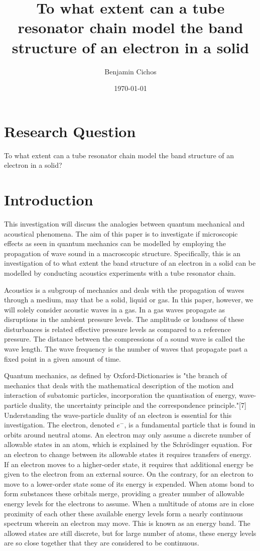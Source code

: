 \documentclass[12pt]{article}
\title{To what extent can a tube resonator chain model the band structure of an electron in a solid}
\author{Benjamin Cichos}
\date{\today}
\begin{document}
\section{Research Question}
To what extent can a tube resonator chain model the band structure of an electron in a solid?
\section{Introduction}  
	This investigation will discuss the analogies between quantum mechanical and acoustical phenomena. The aim of this paper is to investigate if microscopic effects as seen in quantum mechanics can be modelled by employing the propagation of wave sound in a macroscopic structure. Specifically, this is an investigation of to what extent the band structure of an electron in a solid can be modelled by conducting acoustics experiments with a tube resonator chain.	 
	
Acoustics is a subgroup of mechanics and deals with the propagation of waves through a medium, may that be a solid, liquid or gas. In this paper, however, we will solely consider acoustic waves in a gas. In a gas waves propagate as disruptions in the ambient pressure levels. The amplitude or loudness of these disturbances is related effective pressure levels as compared to a reference pressure. The distance between the compressions of a sound wave is called the wave length. The wave frequency is the number of waves that propagate past a fixed point in a given amount of time.
	
Quantum mechanics, as defined by Oxford-Dictionaries is "the branch of mechanics that deals with the mathematical description of the motion and interaction of subatomic particles, incorporation the quantisation of energy, wave-particle duality, the uncertainty principle and the correspondence principle."[7] Understanding the wave-particle duality of an electron is essential for this investigation. The electron, denoted $e^-$, is a fundamental particle that is found in orbits around neutral atoms. An electron may only assume a discrete number of allowable states in an atom, which is explained by the Schrödinger equation. For an electron to change between its allowable states it requires transfers of energy. If an electron moves to a higher-order state, it requires that additional energy be given to the electron from an external source. On the contrary, for an electron to move to a lower-order state some of its energy is expended. When atoms bond to form substances these orbitals merge, providing a greater number of allowable energy levels for the electrons to assume. When a multitude of atoms are in close proximity of each other these available energy levels form a nearly continuous spectrum wherein an electron may move. This is known as an energy band. The allowed states are still discrete, but for large number of atoms, these energy levels are so close together that they are considered to be continuous.
\end{document}
